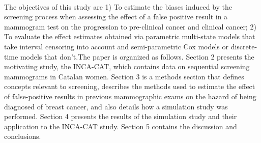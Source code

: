 \paragraph{}The objectives of this study are 1) To estimate the biases induced by the screening process when assessing the effect of a false positive result in a mammogram test on the progression to pre-clinical cancer and clinical cancer; 2) To evaluate the effect estimates obtained via parametric multi-state models that take interval censoring into account and semi-parametric Cox models or discrete-time models that don't.The paper is organized as follows. Section 2 presents the motivating study, the INCA-CAT,  which contains data on sequential screening mammograms in Catalan women. Section 3 is a methods section that defines concepts relevant to screening, describes the methods used to estimate the effect of false-positive results in previous mammographic exams on the hazard of being diagnosed of breast cancer, and also details how a simulation study was performed. Section 4 presents the results of the simulation study and their application to the INCA-CAT study. Section 5 contains the discussion and conclusions.



